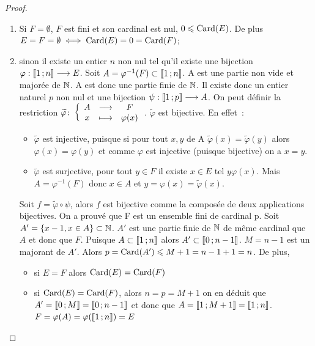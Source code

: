 \begin{proof}
  \begin{enumerate}
    \item Si \(F = \emptyset\), \(F\) est fini et son cardinal est nul, 
      \(0\leqslant\operatorname{Card}(E)\). De plus \(E = F = \emptyset \iff 
      \operatorname{Card}(E)=0 = \operatorname{Card}(F)\);
    \item sinon il existe un entier \(n\) non nul tel qu'il existe une 
      bijection \(\varphi:\mathopen{\llbracket}1\mathclose{}\mathpunct{};n\mathclose{\rrbracket} \longrightarrow E\). Soit 
      \(A = \varphi^{-1}(F) \subset\mathopen{\llbracket}1\mathclose{}\mathpunct{};n\mathclose{\rrbracket}\). A est une partie 
      non vide et majorée de \(\mathbb{N}\). A est donc une partie finie de \(\mathbb{N}\). 
      Il existe donc un entier naturel \(p\) non nul et une bijection 
      \(\psi:\mathopen{\llbracket}1\mathclose{}\mathpunct{};p\mathclose{\rrbracket} \longrightarrow A\). On peut définir la 
      restriction \(\widetilde{\varphi}\colon \left\{\begin{array}{ccc} A & \longrightarrow &F\\ x & \longmapsto & \varphi(x) \end{array} \right.\).  
      \(\widetilde{\varphi}\) est bijective. En effet~:
      \begin{itemize}
        \item \(\widetilde{\varphi}\) est injective, puisque si pour tout 
          \(x, y\) de A \(\widetilde{\varphi}(x)=\widetilde{\varphi}(y)\) 
          alors \(\varphi(x)=\varphi(y)\) et comme \(\varphi\) est injective 
          (puisque bijective) on a \(x = y\).
        \item \(\widetilde{\varphi}\) est surjective, pour tout \(y\in F\) 
          il existe \(x\in E\) tel \(y\varphi(x)\). Mais 
          \(A = \varphi^{-1}(F)\) donc \(x\in A\) et 
          \(y = \varphi(x)=\widetilde{\varphi}(x)\).
      \end{itemize}
      Soit \(f = \widetilde{\varphi}\circ \psi\), alors \(f\) est bijective 
      comme la composée de deux applications bijectives. On a prouvé que F 
      est un ensemble fini de cardinal p. Soit \(A'=\{x - 1, x\in A\}\subset 
      \mathbb{N}\). \(A'\) est une partie finie de \(\mathbb{N}\) de même cardinal que \(A\) 
      et donc que \(F\). Puisque \(A\subset\mathopen{\llbracket}1\mathclose{}\mathpunct{};n\mathclose{\rrbracket}\) alors 
      \(A'\subset\mathopen{\llbracket}0\mathclose{}\mathpunct{};n - 1\mathclose{\rrbracket}\). \(M = n - 1\) est un majorant de 
      \(A'\). Alors \(p = \operatorname{Card}(A')\leqslant M + 1 = n - 1 + 1 = n\). De plus, 
      \begin{itemize}
        \item si \(E = F\) alors \(\operatorname{Card}(E)=\operatorname{Card}(F)\)
        \item si \(\operatorname{Card}(E)=\operatorname{Card}(F)\), alors \(n = p = M + 1\) on en déduit que 
          \(A'=\mathopen{\llbracket}0\mathclose{}\mathpunct{};M\mathclose{\rrbracket} = \mathopen{\llbracket}0\mathclose{}\mathpunct{};n - 1\mathclose{\rrbracket}\) et donc 
          que \(A = \mathopen{\llbracket}1\mathclose{}\mathpunct{};M + 1\mathclose{\rrbracket} = \mathopen{\llbracket}1\mathclose{}\mathpunct{};n\mathclose{\rrbracket}\).  
          \(F = \varphi(A)=\varphi(\mathopen{\llbracket}1\mathclose{}\mathpunct{};n\mathclose{\rrbracket})=E\)
      \end{itemize}
  \end{enumerate}
\end{proof}

